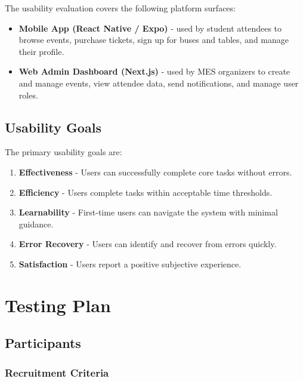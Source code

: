\documentclass[12pt, titlepage]{article}
\begin{document}
The usability evaluation covers the following platform surfaces:
\begin{itemize}
    \item \textbf{Mobile App (React Native / Expo)} - used by student attendees to browse events, purchase tickets, sign up for buses and tables, and manage their profile.
    \item \textbf{Web Admin Dashboard (Next.js)} - used by MES organizers to create and manage events, view attendee data, send notifications, and manage user roles.
\end{itemize}


\subsection{Usability Goals}


The primary usability goals are:


\begin{enumerate}
    \item \textbf{Effectiveness} - Users can successfully complete core tasks without errors.
    \item \textbf{Efficiency} - Users complete tasks within acceptable time thresholds.
    \item \textbf{Learnability} - First-time users can navigate the system with minimal guidance.
    \item \textbf{Error Recovery} - Users can identify and recover from errors quickly.
    \item \textbf{Satisfaction} - Users report a positive subjective experience.
\end{enumerate}


\section{Testing Plan}


\subsection{Participants}


\subsubsection{Recruitment Criteria}
\end{document}
